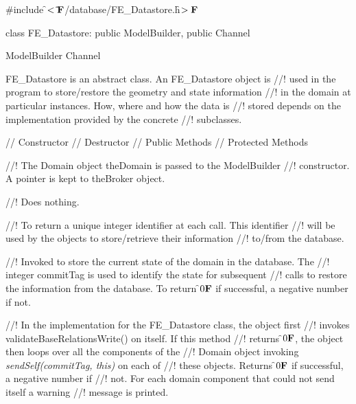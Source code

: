 
\indent \#include \f$<\tilde{ }{\bf F}$/database/FE\_Datastore.h\f$>{\bf F}$

\indent class FE\_Datastore: public ModelBuilder, public Channel

\indent ModelBuilder
\indent Channel
\indent{}

\indent FE\_Datastore is an abstract class. An FE\_Datastore object is
//! used in the program to store/restore the geometry and state information 
//! in the domain at particular instances. How, where and how the data is
//! stored depends on the implementation provided by the concrete
//! subclasses.  

\indent // Constructor
\indent // Destructor
\indent // Public Methods
\indent // Protected Methods

//! The Domain object \p theDomain is passed to the ModelBuilder
//! constructor. A pointer is kept to \p theBroker object.

//! Does nothing.

//! To return a unique integer identifier at each call. This identifier
//! will be used by the objects to store/retrieve their information
//! to/from the database.

//! Invoked to store the current state of the domain in the database. The
//! integer \p commitTag is used to identify the state for subsequent
//! calls to restore the information from the database. To return
\f$0{\bf F}$ if successful, a negative number if not. 

//! In the implementation for the FE\_Datastore class, the object first
//! invokes validateBaseRelationsWrite() on itself. If this method 
//! returns \f$0{\bf F}$, the object then loops over all the components of the
//! Domain object invoking {\em sendSelf(commitTag, this)} on each of
//! these objects. Returns \f$0{\bf F}$ if successful, a negative number if
//! not. For each domain component that could not send itself a warning
//! message is printed. 

